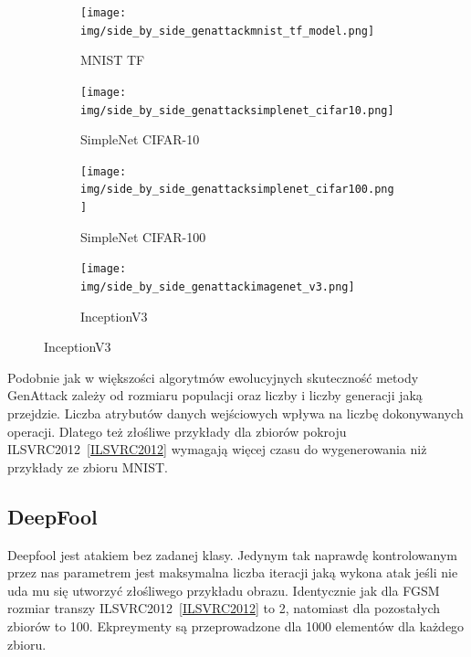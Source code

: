 \documentclass[
    left=2.5cm,         %
    right=2.5cm,        %
    top=2.5cm,          %
    bottom=3cm,         %
    bindingoffset=6mm,  %
    nohyphenation=false %
]{eiti/eiti-thesis}
\begin{document}
\begin{figure}[H]
    \caption{Przykłady wygenerowanych złośliwych przykładów z zadaną klasą za pomocą metody GenAttack}

    \begin{subfigure}[t]{0.48\textwidth}
        \texttt{[image: img/side\_by\_side\_genattackmnist\_tf\_model.png]}
        \caption{MNIST TF}
        \label{fig:mnist_side_genattack}
    \end{subfigure}%
    \hfill
    \begin{subfigure}[t]{0.48\textwidth}
        \texttt{[image: img/side\_by\_side\_genattacksimplenet\_cifar10.png]}
        \caption{SimpleNet CIFAR-10}
        \label{fig:cifar10_side_genattack}
    \end{subfigure}%

    \begin{subfigure}[t]{0.48\textwidth}
        \texttt{[image: img/side\_by\_side\_genattacksimplenet\_cifar100.png]}
        \caption{SimpleNet CIFAR-100}
        \label{fig:cifar100_side_genattack}
    \end{subfigure}%
    \hfill
    \begin{subfigure}[t]{0.48\textwidth}
        \texttt{[image: img/side\_by\_side\_genattackimagenet\_v3.png]}
        \caption{InceptionV3}
        \label{fig:imagenet_side_genattack}
    \end{subfigure}%

\end{figure}



Podobnie jak w większości algorytmów ewolucyjnych skuteczność metody GenAttack zależy od rozmiaru populacji oraz liczby
i liczby generacji jaką przejdzie. Liczba atrybutów danych wejściowych wpływa na liczbę dokonywanych operacji. Dlatego też złośliwe przykłady dla zbiorów pokroju
ILSVRC2012~\ref{ILSVRC2012} wymagają więcej czasu do wygenerowania niż przykłady ze zbioru MNIST.

\subsection{DeepFool}
Deepfool jest atakiem bez zadanej klasy. Jedynym tak naprawdę kontrolowanym przez nas parametrem jest maksymalna
liczba iteracji jaką wykona atak jeśli nie uda mu się utworzyć złośliwego przykładu obrazu. Identycznie jak dla FGSM rozmiar transzy ILSVRC2012~\ref{ILSVRC2012} to 2, natomiast dla pozostałych zbiorów to 100.
Ekpreymenty są przeprowadzone dla 1000 elementów dla każdego zbioru.
\end{document}
